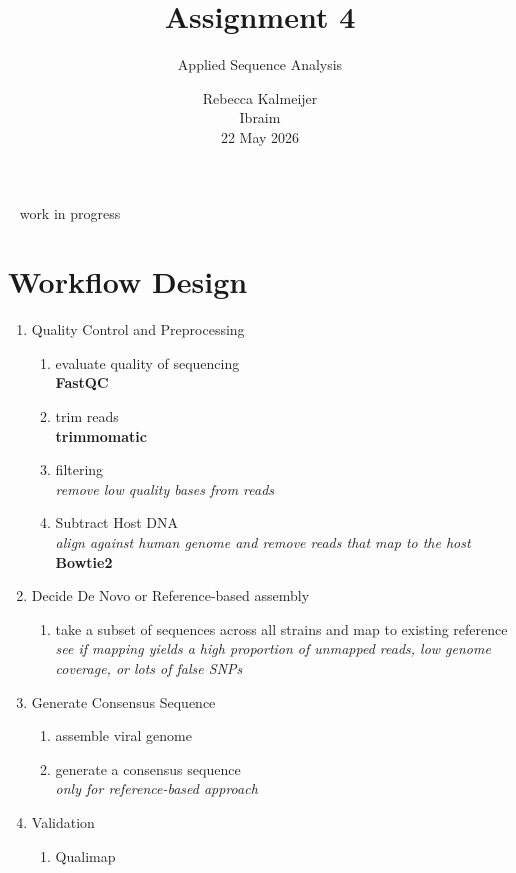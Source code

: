 \documentclass{article}
\title{Assignment 4}
\author{Applied Sequence Analysis}
\date{Rebecca Kalmeijer \\ Ibraim \\ 22 May 2026 }
\begin{document}
\maketitle

~ work in progress ~

\section{Workflow Design}
\begin{enumerate}
    \item Quality Control and Preprocessing
    \begin{enumerate}
        \item evaluate quality of sequencing
        \\ \textbf{FastQC }
        \item trim reads
        \\ \textbf{trimmomatic}
        \item filtering
        \\ \textit{remove low quality bases from reads}
        \item Subtract Host DNA
        \\ \textit{align against human genome and remove reads that map to the host}
        \\\textbf{Bowtie2}
    \end{enumerate}
    \item Decide De Novo or Reference-based assembly
    \begin{enumerate}
        \item take a subset of sequences across all strains and map to existing reference
        \\ \textit{see if  mapping yields a high proportion of unmapped reads, low genome coverage, or lots of false SNPs}
    \end{enumerate}
    \item Generate Consensus Sequence
    \begin{enumerate}
        \item assemble viral genome 
        \item generate a consensus sequence 
        \\ \textit{only for reference-based approach}
    \end{enumerate}
    \item Validation 
    \begin{enumerate}
        \item Qualimap
    \end{enumerate}

\end{enumerate}
\end{document}
